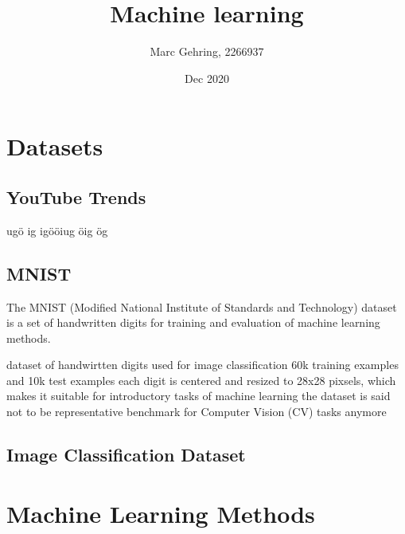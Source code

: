 \documentclass{scrreprt}
\begin{document}
\titlehead{University of Applied Sciences Hamburg}%
\subject{Lab report}							%
\title{Machine learning}					%
\author{Marc Gehring, 2266937}			%
\date{Dec 2020}								%
\publishers{Prof. Dr. S. Hallerberg}	%
\maketitle


\tableofcontents

\chapter{Datasets}
\section{YouTube Trends}
\label{sec:dataset-youtube}
ugö ig igööiug öig ög

\section{MNIST}
\label{sec:dataset-mnist}
The MNIST (Modified National Institute of Standards and Technology) dataset is a set of handwritten digits for training and evaluation of machine learning methods.

dataset of handwirtten digits used for image classification
60k training examples and 10k test examples
each digit is centered and resized to 28x28 pixsels, which makes it suitable for introductory tasks of machine learning
the dataset is said not to be representative benchmark for Computer Vision (CV) tasks anymore

\section{Image Classification Dataset}
\label{sec:image-classification}

\chapter{Machine Learning Methods}
\end{document}
